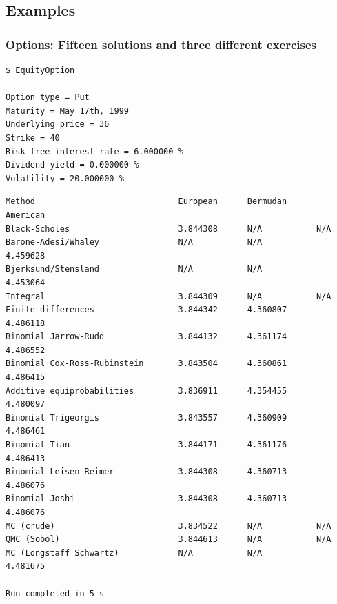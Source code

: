 \documentclass[compress]{beamer}
\begin{document}
\subsection{Examples}
\begin{frame}[fragile]
  \frametitle{Options: Fifteen solutions and three different exercises}
\tiny
  \begin{verbatim}
$ EquityOption

Option type = Put
Maturity = May 17th, 1999
Underlying price = 36
Strike = 40
Risk-free interest rate = 6.000000 %
Dividend yield = 0.000000 %
Volatility = 20.000000 %
  \end{verbatim}

\pause

  \begin{verbatim}
Method                             European      Bermudan      American
Black-Scholes                      3.844308      N/A           N/A
Barone-Adesi/Whaley                N/A           N/A           4.459628
Bjerksund/Stensland                N/A           N/A           4.453064
Integral                           3.844309      N/A           N/A
Finite differences                 3.844342      4.360807      4.486118
Binomial Jarrow-Rudd               3.844132      4.361174      4.486552
Binomial Cox-Ross-Rubinstein       3.843504      4.360861      4.486415
Additive equiprobabilities         3.836911      4.354455      4.480097
Binomial Trigeorgis                3.843557      4.360909      4.486461
Binomial Tian                      3.844171      4.361176      4.486413
Binomial Leisen-Reimer             3.844308      4.360713      4.486076
Binomial Joshi                     3.844308      4.360713      4.486076
MC (crude)                         3.834522      N/A           N/A
QMC (Sobol)                        3.844613      N/A           N/A
MC (Longstaff Schwartz)            N/A           N/A           4.481675

Run completed in 5 s

  \end{verbatim}
\end{frame}
\end{document}
